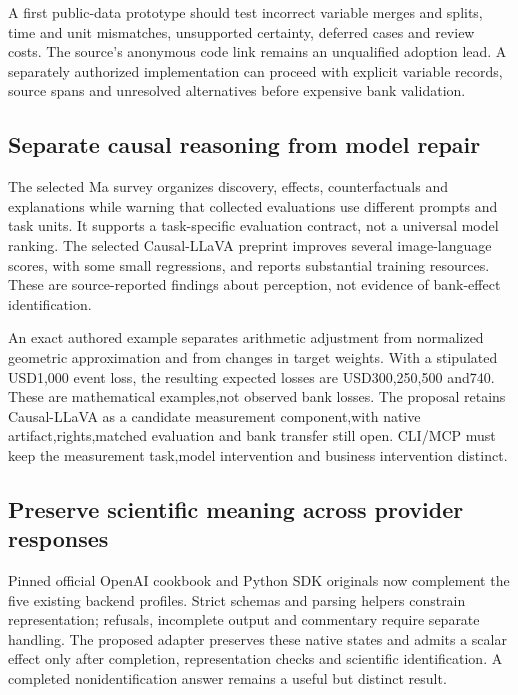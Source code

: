 A first public-data prototype should test incorrect variable merges and
splits, time and unit mismatches, unsupported certainty, deferred cases
and review costs. The source's anonymous code link remains an
unqualified adoption lead. A separately authorized implementation can
proceed with explicit variable records, source spans and unresolved
alternatives before expensive bank validation.

\hypertarget{separate-causal-reasoning-from-model-repair}{%
\subsection{Separate causal reasoning from model
repair}\label{separate-causal-reasoning-from-model-repair}}

The selected Ma survey organizes discovery, effects, counterfactuals and
explanations while warning that collected evaluations use different
prompts and task units. It supports a task-specific evaluation contract,
not a universal model ranking. The selected Causal-LLaVA preprint
improves several image-language scores, with some small regressions, and
reports substantial training resources. These are source-reported
findings about perception, not evidence of bank-effect identification.
\citep{exec28_fr_ma,exec28_fr_hu}

An exact authored example separates arithmetic adjustment from
normalized geometric approximation and from changes in target weights.
With a stipulated USD1,000 event loss, the resulting expected losses are
USD300,250,500 and740. These are mathematical examples,not observed bank
losses. The proposal retains Causal-LLaVA as a candidate measurement
component,with native artifact,rights,matched evaluation and bank
transfer still open. CLI/MCP must keep the measurement task,model
intervention and business intervention distinct.
\citep{exec28_fr_reference}

\hypertarget{preserve-scientific-meaning-across-provider-responses}{%
\subsection{Preserve scientific meaning across provider
responses}\label{preserve-scientific-meaning-across-provider-responses}}

Pinned official OpenAI cookbook and Python SDK originals now complement
the five existing backend profiles. Strict schemas and parsing helpers
constrain representation; refusals, incomplete output and commentary
require separate handling. The proposed adapter preserves these native
states and admits a scalar effect only after completion, representation
checks and scientific identification. A completed nonidentification
answer remains a useful but distinct result.
\citep{exec28_oa_cookbook,exec28_oa_sdk}

